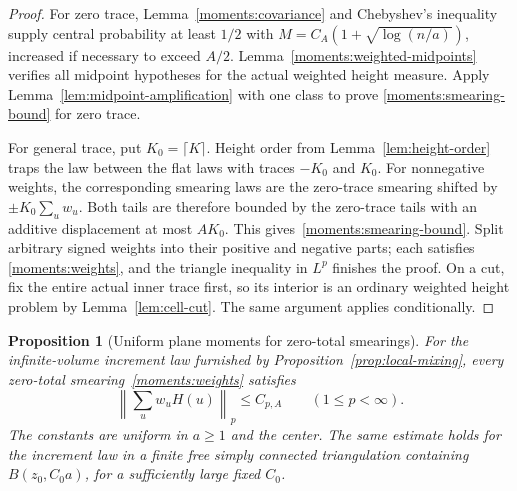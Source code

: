 \documentclass[11pt]{article}
\newtheorem{proposition}[theorem]{Proposition}
\theoremstyle{definition}
\theoremstyle{remark}
\numberwithin{equation}{section}
\begin{document}
\begin{proof}
For zero trace, Lemma~\ref{moments:covariance} and Chebyshev's inequality
supply central probability at least $1/2$ with
$M=C_A(1+\sqrt{\log(n/a)})$, increased if necessary to exceed $A/2$.
Lemma~\ref{moments:weighted-midpoints} verifies all midpoint hypotheses
for the actual weighted height measure.  Apply
Lemma~\ref{lem:midpoint-amplification} with one class to prove
\eqref{moments:smearing-bound} for zero trace.

For general trace, put $K_0=\lceil K\rceil$.  Height order from
Lemma~\ref{lem:height-order} traps the law between the flat laws with
traces $-K_0$ and $K_0$.  For nonnegative weights, the corresponding
smearing laws are the zero-trace smearing shifted by
$\pm K_0\sum_uw_u$.  Both tails are therefore bounded by the
zero-trace tails with an additive displacement at most $AK_0$.
This gives~\eqref{moments:smearing-bound}.  Split arbitrary signed
weights into their positive and negative parts; each satisfies
\eqref{moments:weights}, and the triangle inequality in $L^p$ finishes
the proof.  On a cut, fix the entire actual inner trace first, so its
interior is an ordinary weighted height problem by
Lemma~\ref{lem:cell-cut}.  The same argument applies conditionally.
\end{proof}

\begin{proposition}[Uniform plane moments for zero-total smearings]
\label{prop:plane-moments}
For the infinite-volume increment law furnished by
Proposition~\ref{prop:local-mixing}, every zero-total
smearing~\eqref{moments:weights} satisfies
\begin{equation}\label{moments:plane-bound}
 \left\|\sum_uw_uH(u)\right\|_p\leq C_{p,A}
 \qquad(1\leq p<\infty).
\end{equation}
The constants are uniform in $a\geq1$ and the center.  The same estimate
holds for the increment law in a finite free simply connected
triangulation containing $B(z_0,C_0a)$, for a sufficiently large fixed
$C_0$.
\end{proposition}
\end{document}
